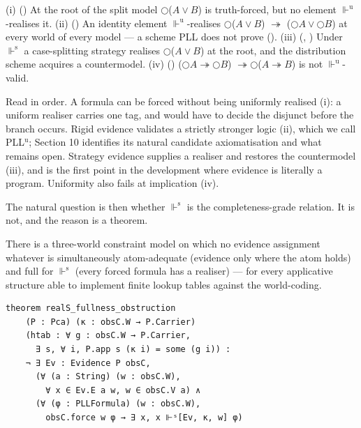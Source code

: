 \begin{theorem}\label{thm:separations}
(i) () At the root of the split
model \ensuremath{\bigcirc}(\ensuremath{A \vee B}) is truth-forced, but no element \ensuremath{\Vdash^{\mathrm{u}}}-realises it.
(ii) () An identity element \ensuremath{\Vdash^{\mathrm{u}}}-realises
\ensuremath{\bigcirc}(\ensuremath{A \vee B}) \ensuremath{\twoheadrightarrow} (\ensuremath{\bigcirc A \vee \bigcirc B}) at every world of every model --- a
scheme PLL does not prove ().
(iii) (, )
Under \ensuremath{\Vdash^{\mathrm{s}}} a case-splitting strategy realises \ensuremath{\bigcirc}(\ensuremath{A \vee B}) at the
root, and the distribution scheme acquires a countermodel.
(iv) ()
(\ensuremath{\bigcirc A \twoheadrightarrow \bigcirc B}) \ensuremath{\twoheadrightarrow \bigcirc}(\ensuremath{A \twoheadrightarrow B}) is not \ensuremath{\Vdash^{\mathrm{u}}}-valid.
\end{theorem}

Read in order. A formula can be forced without being uniformly realised
(i): a uniform realiser carries one tag, and would have to decide the
disjunct before the branch occurs. Rigid evidence validates a strictly
stronger logic (ii), which we call PLL\ensuremath{{}^{\mathrm{u}}};
Section 10 identifies its natural candidate axiomatisation and what
remains open. Strategy evidence supplies a realiser and restores the
countermodel (iii), and is the first point in the development where
evidence is literally a program. Uniformity also fails at implication (iv).

The natural question is then whether \ensuremath{\Vdash^{\mathrm{s}}} is the completeness-grade
relation. It is not, and the reason is a theorem.

\begin{theorem}\label{thm:obstruction}
There is a three-world constraint model on
which no evidence assignment whatever is simultaneously atom-adequate
(evidence only where the atom holds) and full for \ensuremath{\Vdash^{\mathrm{s}}} (every forced
formula has a realiser) --- for every applicative structure able to
implement finite lookup tables against the world-coding.
\end{theorem}

\begin{lstlisting}
theorem realS_fullness_obstruction
    (P : Pca) (κ : obsC.W → P.Carrier)
    (htab : ∀ g : obsC.W → P.Carrier,
      ∃ s, ∀ i, P.app s (κ i) = some (g i)) :
    ¬ ∃ Ev : Evidence P obsC,
      (∀ (a : String) (w : obsC.W),
        ∀ x ∈ Ev.E a w, w ∈ obsC.V a) ∧
      (∀ (φ : PLLFormula) (w : obsC.W),
        obsC.force w φ → ∃ x, x ⊩ˢ[Ev, κ, w] φ)
\end{lstlisting}

